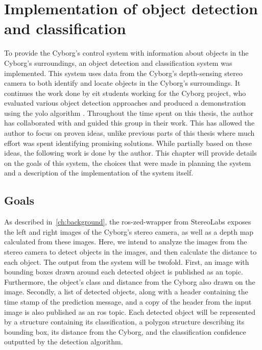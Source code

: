 \documentclass[\rootfolder/main.tex]{subfiles}
\begin{document}
\chapter{Implementation of object detection and classification} %
\label{ch:implementation-objdet} %

To provide the Cyborg's control system with information about objects in the Cyborg's surroundings, an object detection and classification system was implemented.
This system uses data from the Cyborg's depth-sensing stereo camera to both identify and locate objects in the Cyborg's surroundings.
It continues the work done by \acrfull{eit} students working for the Cyborg project, who evaluated various object detection approaches and produced a demonstration using the \acrfull{yolo} algorithm \cite{Opheim2018}.
Throughout the time spent on this thesis, the author has collaborated with and guided this group in their work.
This has allowed the author to focus on proven ideas, unlike previous parts of this thesis where much effort was spent identifying promising solutions.
While partially based on these ideas, the following work is done by the author.
This chapter will provide details on the goals of this system, the choices that were made in planning the system and a description of the implementation of the system itself.


\section{Goals}

As described in~\cref{ch:background}, the ros-zed-wrapper from StereoLabs exposes the left and right images of the Cyborg's stereo camera, as well as a depth map calculated from these images.
Here, we intend to analyze the images from the stereo camera to detect objects in the images, and then calculate the distance to each object.
The output from the system will be twofold.
First, an image with bounding boxes drawn around each detected object is published as an  topic.
Furthermore, the object's class and distance from the Cyborg also drawn on the image.
Secondly, a list of detected objects, along with a header containing the time stamp of the prediction message, and a copy of the header from the input image is also published as an \acrshort{ros} topic.
Each detected object will be represented by a structure containing its classification, a polygon structure describing its bounding box, its distance from the Cyborg, and the classification confidence outputted by the detection algorithm.
\end{document}
